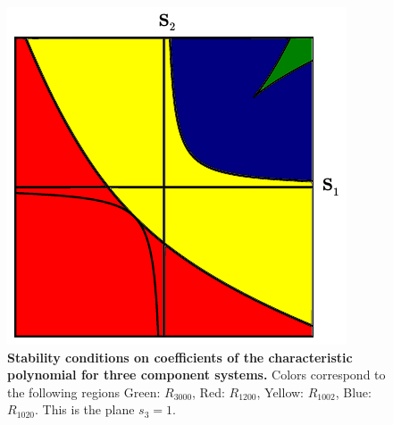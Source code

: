\begin{figure}[!ht]
\centering
\noindent\includegraphics[width=0.5\columnwidth]{fig/region3x3.pdf}
\caption{{\bf Stability conditions on coefficients of the characteristic polynomial for three component systems.} Colors correspond to the following regions Green: $R_{3000}$, Red: $R_{1200}$, Yellow: $R_{1002}$, Blue: $R_{1020}$. This is the plane $s_3=1$.}
\label{fig:region3x3}
\end{figure}
